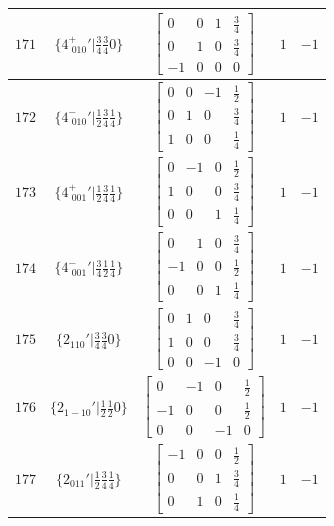 \documentclass[fleqn,8pt]{jsarticle}
\begin{document}
\begin{longtable}{ccccc}
$ 171 $ & $ \{4^{+}_{\,\,010}{}'|\frac{3}{4} \frac{3}{4} 0\} $ & $ \begin{bmatrix} 0 & 0 & 1 & \frac{3}{4} \\ 0 & 1 & 0 & \frac{3}{4} \\ -1 & 0 & 0 & 0 \end{bmatrix} $ & $ 1 $ & $ -1 $ \\ \hline
$ 172 $ & $ \{4^{-}_{\,\,010}{}'|\frac{1}{2} \frac{3}{4} \frac{1}{4}\} $ & $ \begin{bmatrix} 0 & 0 & -1 & \frac{1}{2} \\ 0 & 1 & 0 & \frac{3}{4} \\ 1 & 0 & 0 & \frac{1}{4} \end{bmatrix} $ & $ 1 $ & $ -1 $ \\ \hline
$ 173 $ & $ \{4^{+}_{\,\,001}{}'|\frac{1}{2} \frac{3}{4} \frac{1}{4}\} $ & $ \begin{bmatrix} 0 & -1 & 0 & \frac{1}{2} \\ 1 & 0 & 0 & \frac{3}{4} \\ 0 & 0 & 1 & \frac{1}{4} \end{bmatrix} $ & $ 1 $ & $ -1 $ \\ \hline
$ 174 $ & $ \{4^{-}_{\,\,001}{}'|\frac{3}{4} \frac{1}{2} \frac{1}{4}\} $ & $ \begin{bmatrix} 0 & 1 & 0 & \frac{3}{4} \\ -1 & 0 & 0 & \frac{1}{2} \\ 0 & 0 & 1 & \frac{1}{4} \end{bmatrix} $ & $ 1 $ & $ -1 $ \\ \hline
$ 175 $ & $ \{2{}_{110}{}'|\frac{3}{4} \frac{3}{4} 0\} $ & $ \begin{bmatrix} 0 & 1 & 0 & \frac{3}{4} \\ 1 & 0 & 0 & \frac{3}{4} \\ 0 & 0 & -1 & 0 \end{bmatrix} $ & $ 1 $ & $ -1 $ \\ \hline
$ 176 $ & $ \{2{}_{1-10}{}'|\frac{1}{2} \frac{1}{2} 0\} $ & $ \begin{bmatrix} 0 & -1 & 0 & \frac{1}{2} \\ -1 & 0 & 0 & \frac{1}{2} \\ 0 & 0 & -1 & 0 \end{bmatrix} $ & $ 1 $ & $ -1 $ \\ \hline
$ 177 $ & $ \{2{}_{011}{}'|\frac{1}{2} \frac{3}{4} \frac{1}{4}\} $ & $ \begin{bmatrix} -1 & 0 & 0 & \frac{1}{2} \\ 0 & 0 & 1 & \frac{3}{4} \\ 0 & 1 & 0 & \frac{1}{4} \end{bmatrix} $ & $ 1 $ & $ -1 $ \\ \hline

\end{longtable}
\end{document}
